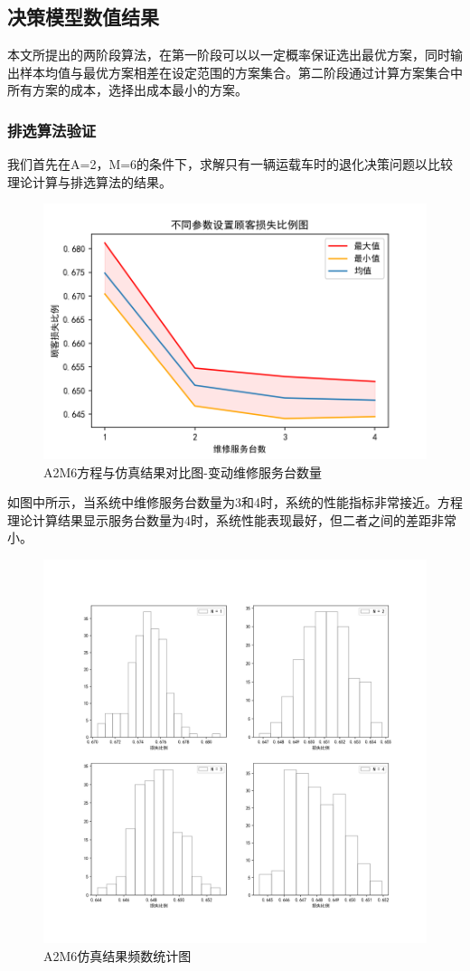 \documentclass{article}
\begin{document}
\subsection{决策模型数值结果}
本文所提出的两阶段算法，在第一阶段可以以一定概率保证选出最优方案，同时输出样本均值与最优方案相差在设定范围的方案集合。第二阶段通过计算方案集合中所有方案的成本，选择出成本最小的方案。
\subsubsection{排选算法验证}
我们首先在A=2，M=6的条件下，求解只有一辆运载车时的退化决策问题以比较理论计算与排选算法的结果。
\begin{figure}[H]
    \centering
    \includegraphics[scale=0.5]{A2M6RS验证图.png}
    \caption{A2M6方程与仿真结果对比图-变动维修服务台数量}
    \label{a2m6rsyz}
\end{figure}
如图中所示，当系统中维修服务台数量为3和4时，系统的性能指标非常接近。方程理论计算结果显示服务台数量为4时，系统性能表现最好，但二者之间的差距非常小。
\begin{figure}[H]
    \centering
    \includegraphics[scale=0.5]{A2M6NormalityTest.png}
    \caption{A2M6仿真结果频数统计图}
    \label{normaltest}
\end{figure}
\end{document}
